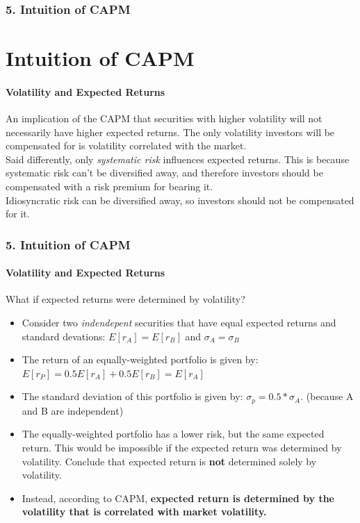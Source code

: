 \documentclass{beamer}
\begin{document}
\begin{frame}[t]
    \frametitle{5. Intuition of CAPM}
    \section{Intuition of CAPM}
    \framesubtitle{Volatility and Expected Returns}

    An implication of the CAPM that securities with higher volatility will not necessarily have higher expected returns.   The only volatility investors will be compensated for is volatility correlated with the market.\\
    \vspace{1em}
    Said differently, only \textit{systematic risk} influences expected returns.   This is because systematic risk can't be diversified away, and therefore investors should be compensated with a risk premium for bearing it.\\
    \vspace{1em}
    Idiosyncratic risk can be diversified away, so investors should not be compensated for it.

\end{frame}

\begin{frame}[t]
    \frametitle{5. Intuition of CAPM}
    \framesubtitle{Volatility and Expected Returns}

    What if expected returns were determined by volatility?
    \begin{itemize}
        \item Consider two \textit{indendepent} securities that have equal 
        expected returns and standard devations: $E[r_A] = E[r_B]$ and $\sigma_A = \sigma_B$
        \item The return of an equally-weighted portfolio is given by:
        $E[r_P] = 0.5  E[r_A] + 0.5 E[r_B] = E[r_A]$
        \item The standard deviation of this portfolio is given by:
        $\sigma_p = 0.5 * \sigma_A$. (because A and B are independent)
        \item The equally-weighted portfolio has a lower risk, but the same expected return.   
        This would be impossible if the expected return was determined by volatility. 
        Conclude that expected return is \textbf{not} determined solely by volatility.
        \item Instead, according to CAPM, \textbf{expected return is determined by the volatility that is 
        correlated with market volatility.}
    \end{itemize}

\end{frame}
\end{document}
